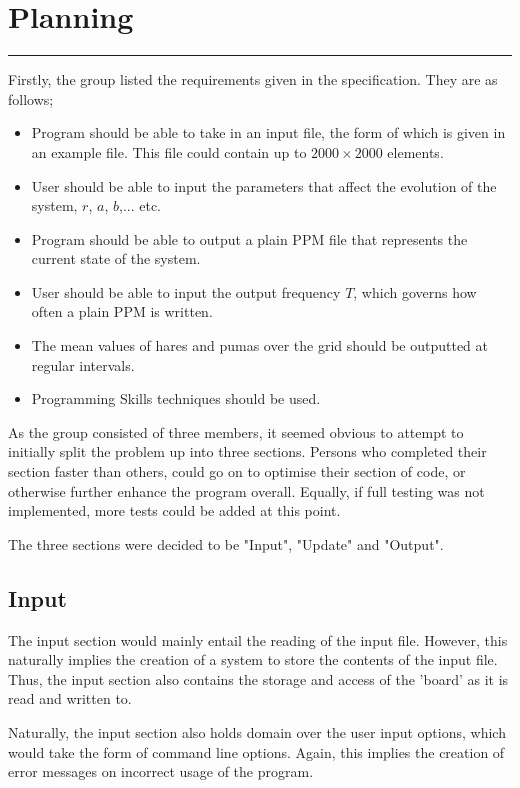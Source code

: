 \section{Planning}
\vspace{-2em}\rule{\textwidth}{1pt}\vspace{1em}

	Firstly, the group listed the requirements given in the specification.
	They are as follows;
	\begin{itemize}
		\item Program should be able to take in an input file, the form of which is given in an example file.
			This file could contain up to $2000\times2000$ elements.
		\item User should be able to input the parameters that affect the evolution of the system, $r$, $a$, $b$,... etc.
		\item Program should be able to output a plain PPM file that represents the current state of the system.
		\item User should be able to input the output frequency $T$, which governs how often a plain PPM is written.
		\item The mean values of hares and pumas over the grid should be outputted at regular intervals.
		\item Programming Skills techniques should be used.
	\end{itemize}
	As the group consisted of three members, it seemed obvious to attempt to initially split the problem up into three sections.
	Persons who completed their section faster than others, could go on to optimise their section of code, or otherwise further enhance the program overall.
	Equally, if full testing was not implemented, more tests could be added at this point.
	
	The three sections were decided to be "Input", "Update" and "Output".

	\subsection{Input}
		The input section would mainly entail the reading of the input file.
		However, this naturally implies the creation of a system to store the contents of the input file.
		Thus, the input section also contains the storage and access of the 'board' as it is read and written to.
		
		Naturally, the input section also holds domain over the user input options, which would take the form of command line options.
		Again, this implies the creation of error messages on incorrect usage of the program.
		
